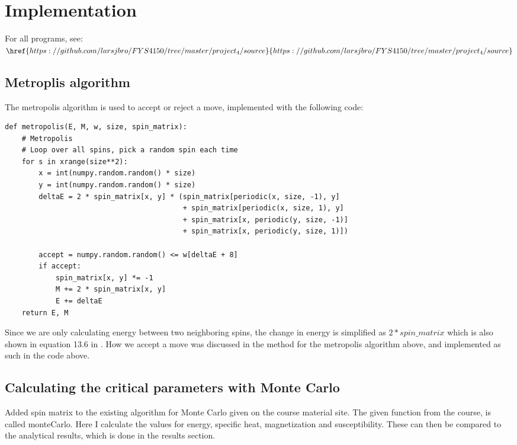 \newpage
\section{Implementation}
For all programs, see:\\
$\href{https://github.com/larsjbro/FYS4150/tree/master/project_4/source}{https://github.com/larsjbro/FYS4150/tree/master/project_4/source}$


\subsection{Metroplis algorithm}
The metropolis algorithm is used to accept or reject a move, implemented with the following code:

\begin{lstlisting}
def metropolis(E, M, w, size, spin_matrix):
    # Metropolis
    # Loop over all spins, pick a random spin each time
    for s in xrange(size**2):
        x = int(numpy.random.random() * size)
        y = int(numpy.random.random() * size)
        deltaE = 2 * spin_matrix[x, y] * (spin_matrix[periodic(x, size, -1), y]
                                          + spin_matrix[periodic(x, size, 1), y]
                                          + spin_matrix[x, periodic(y, size, -1)]
                                          + spin_matrix[x, periodic(y, size, 1)])

        accept = numpy.random.random() <= w[deltaE + 8]
        if accept:
            spin_matrix[x, y] *= -1
            M += 2 * spin_matrix[x, y]
            E += deltaE
    return E, M
\end{lstlisting}

Since we are only calculating energy between two neighboring spins, the change in energy is simplified as $2*spin\_matrix$ which is also shown in equation 13.6 in \cite{isingstat}. How we accept a move was discussed in the method for the metropolis algorithm above, and implemented as such in the code above. 


\subsection{Calculating the critical parameters with Monte Carlo}
Added spin matrix to the existing algorithm for Monte Carlo given on the course material site. The given function from the course, is called monteCarlo. Here I calculate the values for energy, specific heat, magnetization and susceptibility. These can then be compared to the analytical results, which is done in the results section.

